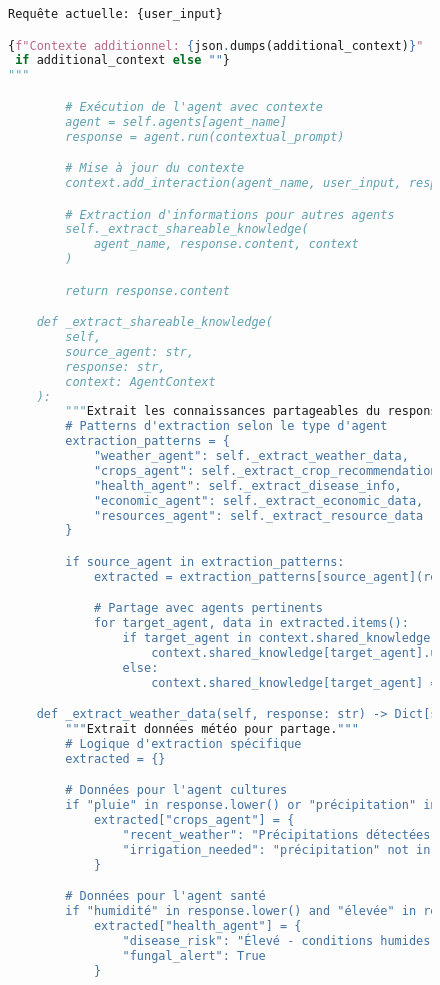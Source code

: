 \begin{figure}[h]
\begin{lstlisting}[language=Python, caption=Système de gestion du contexte inter-agents]
Requête actuelle: {user_input}

{f"Contexte additionnel: {json.dumps(additional_context)}"
 if additional_context else ""}
"""

        # Exécution de l'agent avec contexte
        agent = self.agents[agent_name]
        response = agent.run(contextual_prompt)

        # Mise à jour du contexte
        context.add_interaction(agent_name, user_input, response.content)

        # Extraction d'informations pour autres agents
        self._extract_shareable_knowledge(
            agent_name, response.content, context
        )

        return response.content

    def _extract_shareable_knowledge(
        self,
        source_agent: str,
        response: str,
        context: AgentContext
    ):
        """Extrait les connaissances partageables du response."""
        # Patterns d'extraction selon le type d'agent
        extraction_patterns = {
            "weather_agent": self._extract_weather_data,
            "crops_agent": self._extract_crop_recommendations,
            "health_agent": self._extract_disease_info,
            "economic_agent": self._extract_economic_data,
            "resources_agent": self._extract_resource_data
        }

        if source_agent in extraction_patterns:
            extracted = extraction_patterns[source_agent](response)

            # Partage avec agents pertinents
            for target_agent, data in extracted.items():
                if target_agent in context.shared_knowledge:
                    context.shared_knowledge[target_agent].update(data)
                else:
                    context.shared_knowledge[target_agent] = data

    def _extract_weather_data(self, response: str) -> Dict[str, Any]:
        """Extrait données météo pour partage."""
        # Logique d'extraction spécifique
        extracted = {}

        # Données pour l'agent cultures
        if "pluie" in response.lower() or "précipitation" in response.lower():
            extracted["crops_agent"] = {
                "recent_weather": "Précipitations détectées",
                "irrigation_needed": "précipitation" not in response.lower()
            }

        # Données pour l'agent santé
        if "humidité" in response.lower() and "élevée" in response.lower():
            extracted["health_agent"] = {
                "disease_risk": "Élevé - conditions humides",
                "fungal_alert": True
            }


\end{lstlisting}
\end{figure}
